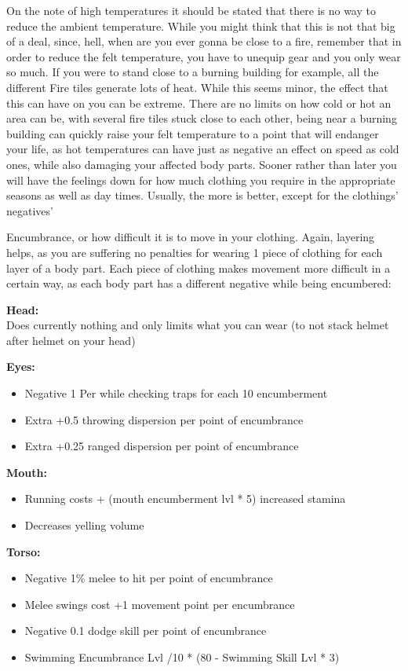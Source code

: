 On the note of high temperatures it should be stated that there is no way to reduce the ambient temperature. While you might think that this is not that big of a deal, since, hell, when are you ever gonna be close to a fire, remember that in order to reduce the felt temperature, you have to unequip gear and you only wear so much. If you were to stand close to a burning building for example, all the different Fire tiles generate lots of heat. While this seems minor, the effect that this can have on you can be extreme. There are no limits on how cold or hot an area can be, with several fire tiles stuck close to each other, being near a burning building can quickly raise your felt temperature to a point that will endanger your life, as hot temperatures can have just as negative an effect on speed as cold ones, while also damaging your affected body parts. Sooner rather than later you will have the feelings down for how much clothing you require in the appropriate seasons as well as day times. Usually, the more is better, except for the clothings' negatives'

Encumbrance, or how difficult it is to move in your clothing. Again, layering helps, as you are suffering no penalties for wearing 1 piece of clothing for each layer of a body part. Each piece of clothing makes movement more difficult in a certain way, as each body part has a different negative while being encumbered:

\textbf{Head:}\\
Does currently nothing and only limits what you can wear (to not stack helmet after helmet on your head)

\textbf{Eyes:}
\begin{itemize}
\item Negative 1 Per while checking traps for each 10 encumberment
\item Extra +0.5 throwing dispersion per point of encumbrance
\item Extra +0.25 ranged dispersion per point of encumbrance
\end{itemize}

\textbf{Mouth:}
\begin{itemize}
\item Running costs + (mouth encumberment lvl * 5) increased stamina
\item Decreases yelling volume
\end{itemize}

\textbf{Torso:}
\begin{itemize}
\item Negative 1\% melee to hit per point of encumbrance
\item Melee swings cost +1 movement point per encumbrance
\item Negative 0.1 dodge skill per point of encumbrance
\item Swimming Encumbrance Lvl /10 * (80 - Swimming Skill Lvl * 3)
\end{itemize}

